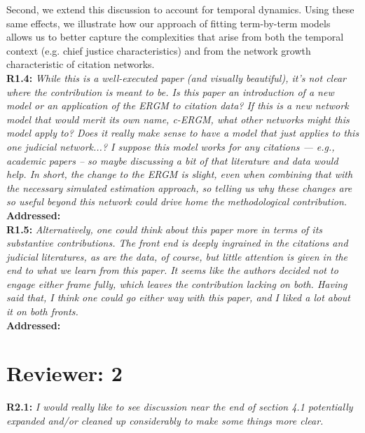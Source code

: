 \documentclass[a4paper,11pt]{texMemo}
\begin{document}
Second, we extend this discussion to account for temporal dynamics. Using these same effects, we illustrate how our approach of fitting term-by-term models allows us to better capture the complexities that arise from both the temporal context (e.g. chief justice characteristics) and from the network growth characteristic of citation networks.\\


\noindent \textbf{R1.4:} \emph{ While this is a well-executed paper (and visually beautiful), it’s not clear where the contribution is meant to be. Is this paper an introduction of a new model or an application of the ERGM to citation data?  If this is a new network model that would merit its own name, c-ERGM, what other networks might this model apply to?  Does it really make sense to have a model that just applies to this one judicial network...? I suppose this model works for any citations --- e.g., academic papers -- so maybe discussing a bit of that literature and data would help. In short, the change to the ERGM is slight, even when combining that with the necessary simulated estimation approach, so telling us why these changes are so useful beyond this network could drive home the methodological contribution.  }\\

\noindent \textbf{Addressed:}   \\

\noindent \textbf{R1.5:} \emph{ Alternatively, one could think about this paper more in terms of its substantive contributions. The front end is deeply ingrained in the citations and judicial literatures, as are the data, of course, but little attention is given in the end to what we learn from this paper. It seems like the authors decided not to engage either frame fully, which leaves the contribution lacking on both. Having said that, I think one could go either way with this paper, and I liked a lot about it on both fronts. }\\

\noindent \textbf{Addressed:}   \\

\section*{Reviewer: 2}


\noindent \textbf{R2.1:} \emph{ I would really like to see discussion near the end of section 4.1 potentially expanded and/or cleaned up considerably to make some things more clear.}\\
\end{document}
